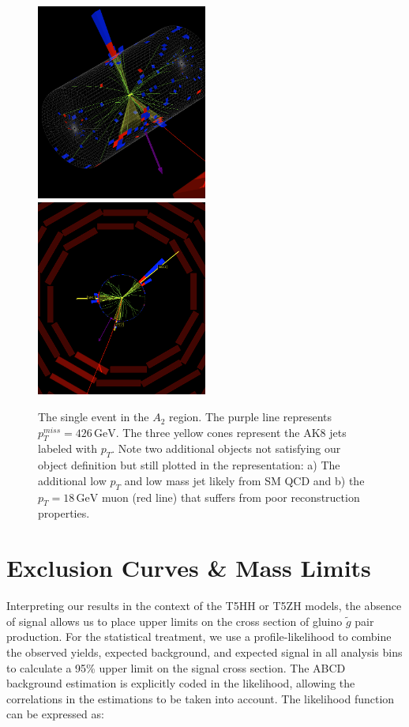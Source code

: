 \begin{figure}
\centering
\includegraphics[width=0.5\textwidth]{figs/fireworks_ak8barrel.png}\\
\includegraphics[width=0.5\textwidth]{figs/fireworks_ak8rhophi.png}
\caption[The single event in the $A_{2}$ region.]{The single event in the $A_{2}$ region. The purple line represents $p_{T}^{miss}=426\,\textrm{GeV}$. The three yellow cones represent the AK8 jets labeled with $p_{T}$.  Note two additional objects not satisfying our object definition but still plotted in the representation: a) The additional low $p_{T}$ and low mass jet likely from SM QCD and b) the $p_{T}=18\,\textrm{GeV}$ muon (red line) that suffers from poor reconstruction properties.}
\label{fig:fireworks}
\end{figure}

\section{Exclusion Curves \& Mass Limits}

Interpreting our results in the context of the T5HH or T5ZH models, the absence of signal allows us to place upper limits on the cross section of gluino $\tilde{g}$ pair production. For the statistical treatment, we use a profile-likelihood to combine the observed yields, expected background, and expected signal in all analysis bins to calculate a 95\% upper limit on the signal cross section. The ABCD background estimation is explicitly coded in the likelihood, allowing the correlations in the estimations to be taken into account. The likelihood function can be expressed as:

